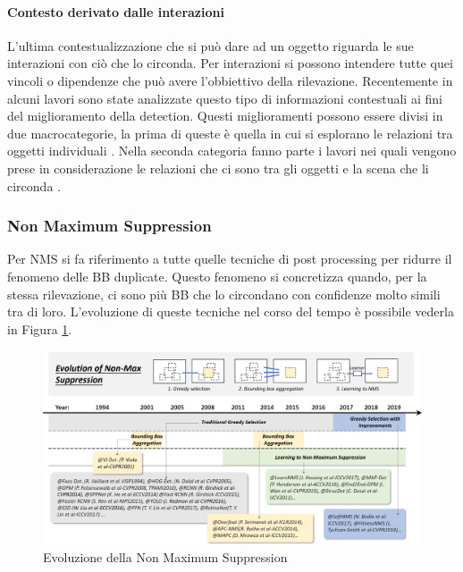 \paragraph{Contesto derivato dalle interazioni}
L'ultima contestualizzazione che si può dare ad un oggetto riguarda le sue interazioni con ciò che lo circonda. Per interazioni si possono intendere tutte quei vincoli o dipendenze che può avere l'obbiettivo della rilevazione. Recentemente in alcuni lavori sono state analizzate questo tipo di informazioni contestuali ai fini del miglioramento della detection. Questi miglioramenti possono essere divisi in due macrocategorie, la prima di queste è quella in cui si esplorano le relazioni tra oggetti individuali \cite{felzenszwalb2009object, desai2011discriminative, song2011contextualizing, chen2017spatial, hu2018relation}. Nella seconda categoria fanno parte i lavori nei quali vengono prese in considerazione le relazioni che ci sono tra gli oggetti e la scena che li circonda \cite{gupta2015exploring, liu2018structure}.
\subsubsection{Non Maximum Suppression}
Per \ac{NMS} si fa riferimento a tutte quelle tecniche di post processing per ridurre il fenomeno delle \ac{BB} duplicate. Questo fenomeno si concretizza quando, per la stessa rilevazione, ci sono più \ac{BB} che lo circondano con confidenze molto simili tra di loro. L'evoluzione di queste tecniche nel corso del tempo è possibile vederla in Figura \ref{fig:NMS_history}. 
\begin{figure}
    \centering
    \includegraphics[width=\textwidth]{images/evol-nms.png}
    \caption{Evoluzione della Non Maximum Suppression \cite{DBLP:journals/corr/abs-1905-05055}}
    \label{fig:NMS_history}
\end{figure}


